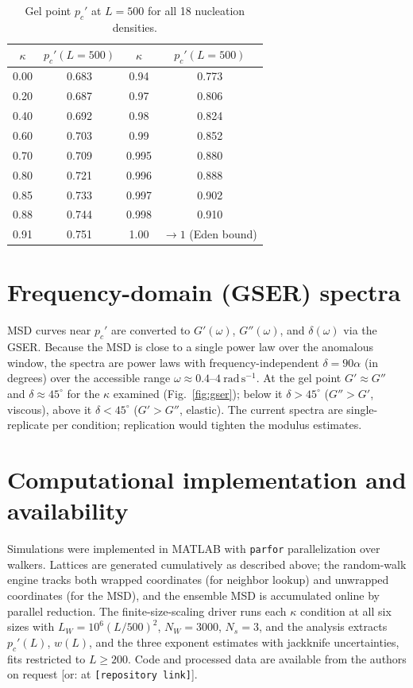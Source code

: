\documentclass[aps,prl,twocolumn,superscriptaddress,floatfix,nofootinbib,longbibliography]{revtex4-2}
\newcommand{\pcp}{p_c'}
\newcommand{\kap}{\kappa}
\begin{document}
\begin{table}[h]
\centering
\caption{Gel point $\pcp$ at $L=500$ for all 18 nucleation densities.}
\label{tab:kappa}
\begin{tabular}{cc@{\hspace{2em}}cc}
\toprule
$\kap$ & $\pcp(L{=}500)$ & $\kap$ & $\pcp(L{=}500)$ \\
\midrule
0.00 & 0.683 & 0.94  & 0.773 \\
0.20 & 0.687 & 0.97  & 0.806 \\
0.40 & 0.692 & 0.98  & 0.824 \\
0.60 & 0.703 & 0.99  & 0.852 \\
0.70 & 0.709 & 0.995 & 0.880 \\
0.80 & 0.721 & 0.996 & 0.888 \\
0.85 & 0.733 & 0.997 & 0.902 \\
0.88 & 0.744 & 0.998 & 0.910 \\
0.91 & 0.751 & 1.00  & $\to1$ (Eden bound) \\
\bottomrule
\end{tabular}
\end{table}

\section{Frequency-domain (GSER) spectra}
MSD curves near $\pcp$ are converted to $G'(\omega)$, $G''(\omega)$, and $\delta(\omega)$ via the
GSER. Because the MSD is close to a single power law over the anomalous window, the spectra are
power laws with frequency-independent $\delta=90\alpha$ (in degrees) over the accessible range
$\omega\approx0.4$--$4~\mathrm{rad\,s^{-1}}$. At the gel point $G'\approx G''$ and
$\delta\approx45^{\circ}$ for the $\kap$ examined (Fig.~\ref{fig:gser}); below it $\delta>45^{\circ}$
($G''>G'$, viscous), above it $\delta<45^{\circ}$ ($G'>G''$, elastic). The current spectra are
single-replicate per condition; replication would tighten the modulus estimates.

\section{Computational implementation and availability}
Simulations were implemented in MATLAB with \texttt{parfor} parallelization over walkers.
Lattices are generated cumulatively as described above; the random-walk engine tracks both wrapped
coordinates (for neighbor lookup) and unwrapped coordinates (for the MSD), and the ensemble MSD
is accumulated online by parallel reduction. The finite-size-scaling driver runs each $\kap$
condition at all six sizes with $L_W=10^6(L/500)^2$, $N_W=3000$, $N_s=3$, and the analysis
extracts $\pcp(L)$, $w(L)$, and the three exponent estimates with jackknife uncertainties, fits
restricted to $L\ge200$. Code and processed data are available from the authors on request
[or: at \texttt{[repository link]}].
\end{document}
